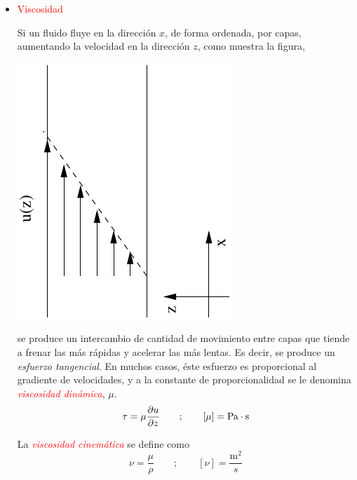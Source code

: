 \begin{itemize}
\begin{itemize}
\begin{quotation}
			\subsection*{Ejercicio} 
			Para el agua, a $20^\circ C$ y presi\'on atmosf\'erica, $\beta_T \approx \unit[2.2\times 10^9]{Pa}$
			y $\rho \approx \unit[1000]{Kg/m^3}$.
			Calcular para qu\'e orden de magnitud de velocidad de flujo el agua debe empezar a considerarse compresible.
		\end{quotation}
		
		\item{\textcolor{red}{Viscosidad}}
		
		Si un fluido fluye en la direcci\'on $x$, de forma ordenada, por capas, aumentando la velocidad en la direcci\'on
		$z$, como muestra la figura,
		
		\begin{center}
			\includegraphics[scale=1,angle=270]{TeX_files/chapter01-Introduccion/u_z.pdf}
		\end{center}
		
		se produce un intercambio de cantidad de movimiento entre capas que tiende a frenar las m\'as r\'apidas y acelerar las m\'as lentas. Es decir, se produce un \textit{esfuerzo tangencial}. En muchos casos, \'este esfuerzo es proporcional al gradiente de velocidades, y a la constante de proporcionalidad se le denomina \textit{\textcolor{red}{viscosidad din\'amica}}, $\mu$.
		$$
		\tau = \mu \frac{\partial u}{\partial z} \qquad ; \qquad \left[\mu\right] = \textrm{Pa}\cdot\textrm{s}
		$$
		
		La \textit{\textcolor{red}{viscosidad cinem\'atica}} se define como
		$$
		\nu = \frac{\mu}{\rho} \qquad ; \qquad \left[\nu\right] = \frac{\textrm{m}^2}{s}
		$$
		

\end{itemize}
\end{itemize}

